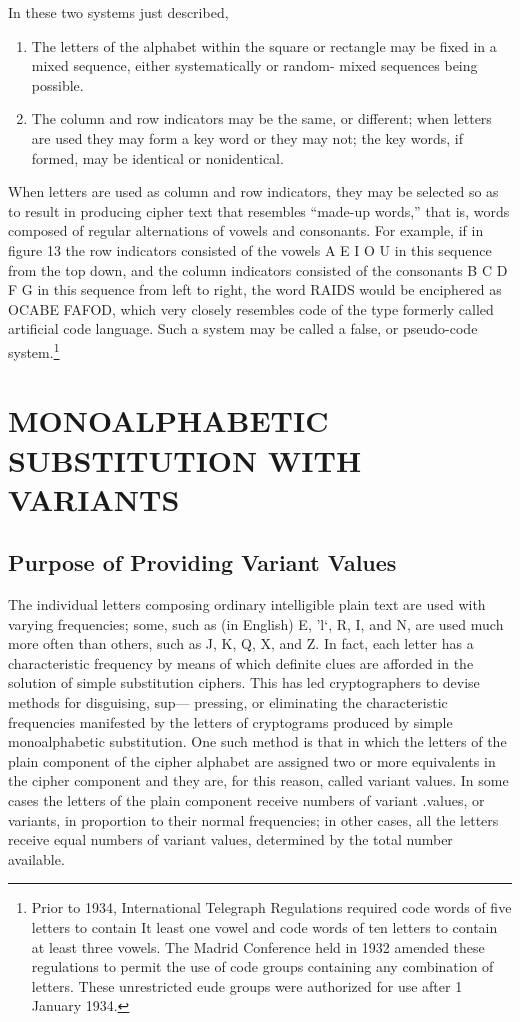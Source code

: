 \mypara In these two systems just described,

\begin{enumerate}
\item The letters of the alphabet within the square or rectangle may
be ﬁxed in a mixed sequence, either systematically or random-
mixed sequences being possible.

\item The column and row indicators may be the same, or different;
when letters are used they may form a key word or they may
not; the key words, if formed, may be identical or nonidentical.
\end{enumerate}

\mypara When letters are used as column and row indicators, they may be
selected so as to result in producing cipher text that resembles “made-up
words,” that is, words composed of regular alternations of vowels and
consonants. For example, if in ﬁgure 13 the row indicators consisted of
the vowels A E I O U in this sequence from the top down, and the
column indicators consisted of the consonants B C D F G in this
sequence from left to right, the word RAIDS would be enciphered as
OCABE FAFOD, which very closely resembles code of the type formerly called artiﬁcial code language. Such a system may be called a
false, or pseudo-code system.\footnote{Prior to 1934, International Telegraph Regulations required code words of ﬁve letters to contain It least one vowel and code words of ten letters to contain at least three vowels. The Madrid Conference held in 1932 amended these regulations to permit the use of code groups containing any combination of letters. These unrestricted eude groups were authorized for use after 1 January 1934.}

\section{MONOALPHABETIC SUBSTITUTION WITH VARIANTS}

\subsection{Purpose of Providing Variant Values}

The individual letters composing ordinary intelligible plain text are
used with varying frequencies; some, such as (in English) E, 'l‘, R, I,
and N, are used much more often than others, such as J, K, Q, X, and Z.
In fact, each letter has a characteristic frequency by means of which
deﬁnite clues are afforded in the solution of simple substitution ciphers.
This has led cryptographers to devise methods for disguising, sup—
pressing, or eliminating the characteristic frequencies manifested by the
letters of cryptograms produced by simple monoalphabetic substitution.
One such method is that in which the letters of the plain component of
the cipher alphabet are assigned two or more equivalents in the cipher
component and they are, for this reason, called variant values. In some
cases the letters of the plain component receive numbers of variant
.values, or variants, in proportion to their normal frequencies; in other
cases, all the letters receive equal numbers of variant values, determined
by the total number available.

